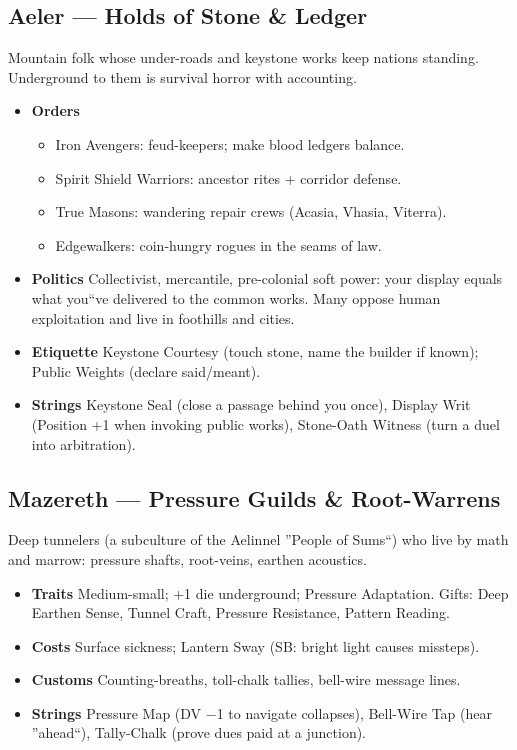 \documentclass[11pt]{article}
\begin{document}
\subsection{Aeler --- Holds of Stone \& Ledger}
Mountain folk whose under-roads and keystone works keep nations standing. Underground to them is survival horror with accounting.
\begin{itemize}
    \item \textbf{Orders}
    \begin{itemize}
        \item Iron Avengers: feud-keepers; make blood ledgers balance.
        \item Spirit Shield Warriors: ancestor rites + corridor defense.
        \item True Masons: wandering repair crews (Acasia, Vhasia, Viterra).
        \item Edgewalkers: coin-hungry rogues in the seams of law.
    \end{itemize}
    \item \textbf{Politics} Collectivist, mercantile, pre-colonial soft power: your display equals what you``ve delivered to the common works. Many oppose human exploitation and live in foothills and cities.
    \item \textbf{Etiquette} Keystone Courtesy (touch stone, name the builder if known); Public Weights (declare said/meant).
    \item \textbf{Strings} Keystone Seal (close a passage behind you once), Display Writ (Position +1 when invoking public works), Stone-Oath Witness (turn a duel into arbitration).
\end{itemize}

\subsection{Mazereth --- Pressure Guilds \& Root-Warrens}
Deep tunnelers (a subculture of the Aelinnel ''People of Sums``) who live by math and marrow: pressure shafts, root-veins, earthen acoustics.
\begin{itemize}
    \item \textbf{Traits} Medium-small; +1 die underground; Pressure Adaptation. Gifts: Deep Earthen Sense, Tunnel Craft, Pressure Resistance, Pattern Reading.
    \item \textbf{Costs} Surface sickness; Lantern Sway (SB: bright light causes missteps).
    \item \textbf{Customs} Counting-breaths, toll-chalk tallies, bell-wire message lines.
    \item \textbf{Strings} Pressure Map (DV −1 to navigate collapses), Bell-Wire Tap (hear ''ahead``), Tally-Chalk (prove dues paid at a junction).
\end{itemize}
\end{document}
